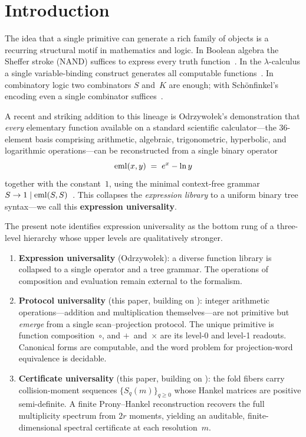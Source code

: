 \section{Introduction}\label{sec:intro}

The idea that a single primitive can generate a rich family of
objects is a recurring structural motif in mathematics and logic.
In Boolean algebra the Sheffer stroke (NAND) suffices to express
every truth function~\cite{Sheffer1913}.
In the $\lambda$-calculus a single variable-binding construct
generates all computable functions~\cite{Church1936}.
In combinatory logic two combinators $S$ and~$K$ are enough;
with Sch\"onfinkel's encoding even a single combinator
suffices~\cite{Schonfinkel1924}.

A recent and striking addition to this lineage is
Odrzywołek's demonstration that \emph{every} elementary function
available on a standard scientific calculator---the 36-element
basis comprising arithmetic, algebraic, trigonometric, hyperbolic,
and logarithmic operations---can be reconstructed from a single
binary operator
\begin{equation}\label{eq:eml-def-intro}
  \operatorname{eml}(x,y) \;=\; e^{x} - \ln y
\end{equation}
together with the constant~$1$, using the minimal context-free
grammar $S \to 1 \mid \operatorname{eml}(S,S)$~\cite{Odrzywołek2026}.
This collapses the \emph{expression library} to a uniform binary
tree syntax---we call this \textbf{expression universality}.

The present note identifies expression universality as the bottom
rung of a three-level hierarchy whose upper levels are qualitatively
stronger.

\begin{enumerate}[label=\textbf{L\arabic*},leftmargin=2.5em]
\item \textbf{Expression universality} (Odrzywołek):
  a diverse function library is collapsed to a single operator and
  a tree grammar.  The operations of composition and evaluation
  remain external to the formalism.
\item \textbf{Protocol universality} (this paper, building on
  \cite{OmegaSPG2026}):
  integer arithmetic operations---addition and multiplication
  themselves---are not primitive but \emph{emerge} from a single
  scan--projection protocol.  The unique primitive is function
  composition~$\circ$, and $+$~and~$\times$ are its level-0 and
  level-1 readouts.  Canonical forms are computable, and the word
  problem for projection-word equivalence is decidable.
\item \textbf{Certificate universality} (this paper, building on
  \cite{OmegaSPG2026}):
  the fold fibers carry collision-moment sequences
  $\{S_q(m)\}_{q \ge 0}$ whose Hankel matrices are positive
  semi-definite.  A finite Prony--Hankel reconstruction recovers
  the full multiplicity spectrum from $2r$ moments, yielding an
  auditable, finite-dimensional spectral certificate at each
  resolution~$m$.
\end{enumerate}

